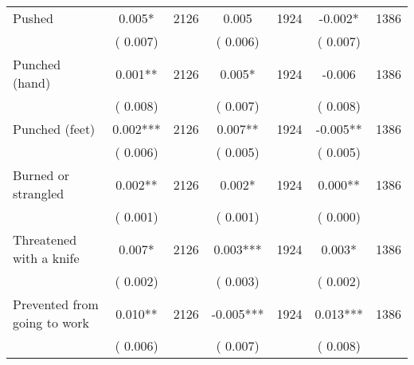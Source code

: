 \begin{tabular}{l*{6}{c}}
Pushed        &              0.005*      &       2126       &              0.005      &       1924       &             -0.002*      &       1386       \\
                       &       (       0.007)            &                               &       (       0.006)            &                               &       (       0.007)            &                               \\
Punched (hand)        &              0.001**      &       2126       &              0.005*      &       1924       &             -0.006      &       1386       \\
                       &       (       0.008)            &                               &       (       0.007)            &                               &       (       0.008)            &                               \\
Punched (feet)        &              0.002***      &       2126       &              0.007**      &       1924       &             -0.005**      &       1386       \\
                       &       (       0.006)            &                               &       (       0.005)            &                               &       (       0.005)            &                               \\
Burned or strangled        &              0.002**      &       2126       &              0.002*      &       1924       &              0.000**      &       1386       \\
                       &       (       0.001)            &                               &       (       0.001)            &                               &       (       0.000)            &                               \\
Threatened with a knife        &              0.007*      &       2126       &              0.003***      &       1924       &              0.003*      &       1386       \\
                       &       (       0.002)            &                               &       (       0.003)            &                               &       (       0.002)            &                               \\
Prevented from going to work        &              0.010**      &       2126       &             -0.005***      &       1924       &              0.013***      &       1386       \\
                       &       (       0.006)            &                               &       (       0.007)            &                               &       (       0.008)            &                               \\

\end{tabular}
